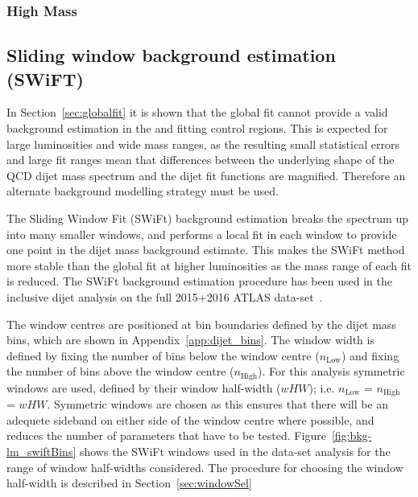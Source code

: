 \subsubsection{High Mass}
\label{sec:highmass_globalFit}

\subsection{Sliding window background estimation (SWiFT)}
\label{sec:swift}

In Section~\ref{sec:globalfit} it is shown that the global fit cannot provide a
valid background estimation in the \hm{} and \lm{} fitting control regions.
This is expected for large luminosities and wide mass ranges,
as the resulting small statistical errors and large fit ranges mean that
differences between the underlying shape of the QCD dijet mass spectrum
and the dijet fit functions are magnified.
Therefore an alternate background modelling strategy must be used.

The Sliding Window Fit (SWiFt) background estimation breaks the spectrum up into many smaller windows,
and performs a local fit in each window to provide one point in the dijet mass background estimate.
This makes the SWiFt method more stable than the global fit at higher luminosities as the mass range of each fit is reduced.
The SWiFt background estimation procedure has been used in the inclusive dijet analysis on the full 2015+2016 ATLAS data-set~\cite{dijet_mori17_paper}.

The window centres are positioned at bin boundaries defined by the dijet mass bins, which are shown in Appendix~\ref{app:dijet_bins}.
The window width is defined by fixing the number of bins below the window centre ($n_{\text{Low}}$)
and fixing the number of bins above the window centre ($n_{\text{High}}$).
For this analysis symmetric windows are used, defined by their window half-width ($wHW$); i.e. $n_{\text{Low}}$ = $n_{\text{High}}$ = $wHW$.
Symmetric windows are chosen as this ensures that there will be an adequete sideband on either side of the window centre where possible,
and reduces the number of parameters that have to be tested.
Figure~\ref{fig:bkg-lm_swiftBins} shows the SWiFt windows used in the \lm{} data-set analysis for the range of window half-widths considered.
The procedure for choosing the window half-width is described in Section~\ref{sec:windowSel}

